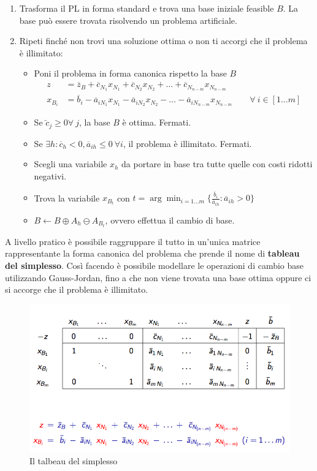 \begin{enumerate}
	\item Trasforma il PL in forma standard e trova una base iniziale feasible $B$. La base può essere trovata risolvendo un problema artificiale.
	\item Ripeti finché non trovi una soluzione ottima o non ti accorgi che il problema è illimitato:
	\begin{itemize}
		\item Poni il problema in forma canonica rispetto la base $B$
		\begin{align*}
		z &= \overline{z}_B + \overline{c}_{N_1} x_{N_1} 
		+ \overline{c}_{N_2} x_{N_2} + \ldots + \overline{c}_{N_{n-m}} x_{N_{n-m}} \\
		x_{B_i} &= \overline{b}_i - \overline{a}_{iN_1} x_{N_1} - \overline{a}_{iN_2} x_{N_2} - \ldots - \overline{a}_{iN_{n-m}} x_{N_{n-m}} \qquad \forall \: i \in [1 \ldots m]
		\end{align*}
		\item Se $\overleftarrow{c}_j \geq 0 \forall \ j$, la base $B$ è ottima. Fermati.
		\item Se $\exists h : \overline{c}_h < 0 , \overline{a}_{ih}\leq 0 \ \forall i$, il problema è illimitato. Fermati.
		\item Scegli una variabile $x_h$ da portare in base tra tutte quelle con costi ridotti negativi.
		\item Trova la variabile $x_{B_t}$ con $ t = \arg \min_{i = 1 \ldots m} \bigg\{ \frac{\overline{b}_i}{\overline{a}_{ih}}  : \overline{a}_{ih} > 0 \bigg\}$
		\item $B \leftarrow B \oplus A_h \ominus A_{B_t}$, ovvero effettua il cambio di base.
	\end{itemize}
\end{enumerate}

\noindent A livello pratico è possibile raggruppare il tutto in un'unica matrice rappresentante la forma canonica del problema che prende il nome di \textbf{tableau del simplesso}.
Così facendo è possibile modellare le operazioni di cambio base utilizzando Gauss-Jordan, fino a che non viene trovata una base ottima oppure ci si accorge che il problema è illimitato.

\begin{figure}[htbp]
	\centering
	\includegraphics[width = .7\textwidth]{images/l9-fig-3.png}
	\caption{Il talbeau del simplesso}
\end{figure}










